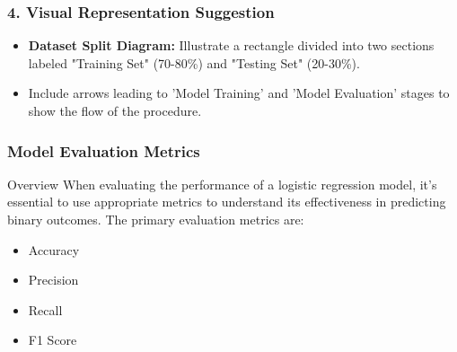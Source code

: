 \documentclass[aspectratio=169]{beamer}
\begin{document}
\begin{frame}[fragile]
    \frametitle{4. Visual Representation Suggestion}
    \begin{itemize}
        \item \textbf{Dataset Split Diagram:} Illustrate a rectangle divided into two sections labeled "Training Set" (70-80\%) and "Testing Set" (20-30\%).
        \item Include arrows leading to 'Model Training' and 'Model Evaluation' stages to show the flow of the procedure.
    \end{itemize}
\end{frame}

\begin{frame}[fragile]
  \frametitle{Model Evaluation Metrics}
  \begin{block}{Overview}
    When evaluating the performance of a logistic regression model, it’s essential to use appropriate metrics to understand its effectiveness in predicting binary outcomes. The primary evaluation metrics are:
    \begin{itemize}
      \item Accuracy
      \item Precision
      \item Recall
      \item F1 Score
    \end{itemize}
  \end{block}
\end{frame}
\end{document}
